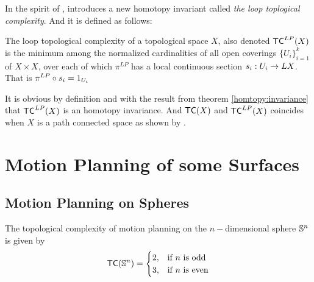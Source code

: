 In the spirit of \cite{farber2003topological}, \cite{derfoufi2015loop} introduces a new homotopy invariant called \textit{the loop toplogical complexity}. And it is defined as follows:

\begin{defn}
    The loop topological complexity of a topological space $X$, also denoted $\textsf{TC}^{LP}(X)$ is the minimum among the normalized cardinalities of all
    open coverings $\{U_i\}_{i = 1}^k$ of $X \times X$, over each of which $\pi^{LP}$ has a local continuous section $s_i : U_i \rightarrow LX$. That is $\displaystyle \pi^{LP} \circ s_i = 1_{U_i}$
\end{defn}

It is obvious by definition and with the result from theorem \ref{homtopy:invariance} that $\textsf{TC}^{LP}(X)$ is an homotopy invariance. And $\textsf{TC}(X)$ and $\textsf{TC}^{LP}(X)$ coincides when $X$ is a path connected space as shown by \cite{derfoufi2015loop}.


\section{Motion Planning of some Surfaces}

\subsection{Motion Planning on Spheres}
\begin{thm}\label{tcomp-of-sphere}
    The topological complexity of motion planning on the $n-$dimensional sphere $\mathbb{S}^n$ is given by
    \[
        \textsf{TC}(\mathbb{S}^n) = \begin{cases}
            2, & \text{if $n$ is odd}  \\
            3, & \text{if $n$ is even} \\
        \end{cases}
    \]
\end{thm}

